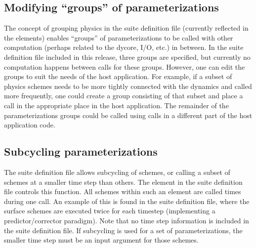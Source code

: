 \subsection{Modifying ``groups'' of parameterizations}

The concept of grouping physics in the suite definition file (currently reflected in the  elements) enables ``groups'' of parameterizations to be called with other computation (perhaps related to the dycore, I/O, etc.) in between. In the suite definition file included in this release, three groups are specified, but currently no computation happens between  calls for these groups. However, one can edit the groups to suit the needs of the host application. For example, if a subset of physics schemes needs to be more tightly connected with the dynamics and called more frequently, one could create a group consisting of that subset and place a  call in the appropriate place in the host application. The remainder of the parameterizations groups could be called using  calls in a different part of the host application code.

\subsection{Subcycling parameterizations}

The suite definition file allows subcycling of schemes, or calling a subset of schemes at a smaller time step than others. The \execout{>} element in the suite definition file controls this function. All schemes within such an element are called  times during one  call. An example of this is found in the  suite definition file, where the surface schemes are executed twice for each timestep (implementing a predictor/corrector paradigm). Note that no time step information is included in the suite definition file. If subcycling is used for a set of parameterizations, the smaller time step must be an input argument for those schemes. 
